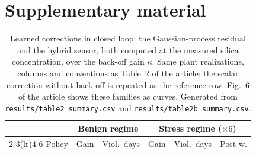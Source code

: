 \section*{Supplementary material}

\begin{table}[t]\centering\footnotesize
\caption{Learned corrections in closed loop: the Gaussian-process
residual and the hybrid sensor, both computed at the measured silica
concentration, over the back-off gain $\kappa$. Same plant
realizations, columns and conventions as Table~2 of the article; the
scalar correction without back-off is repeated as the reference row.
Fig.~6 of the article shows these families as curves. Generated from
\texttt{results/table2\_summary.csv} and
\texttt{results/table2b\_summary.csv}.}
\label{tab:learned}
\begin{tabular}{lccccc}
\toprule
 & \multicolumn{2}{c}{Benign regime} & \multicolumn{3}{c}{Stress regime
 ($\times 6$)} \\
\cmidrule(lr){2-3}\cmidrule(lr){4-6}
Policy & Gain & Viol.\ days & Gain & Viol.\ days & Post-w. \\
\midrule

\bottomrule
\end{tabular}
\end{table}
